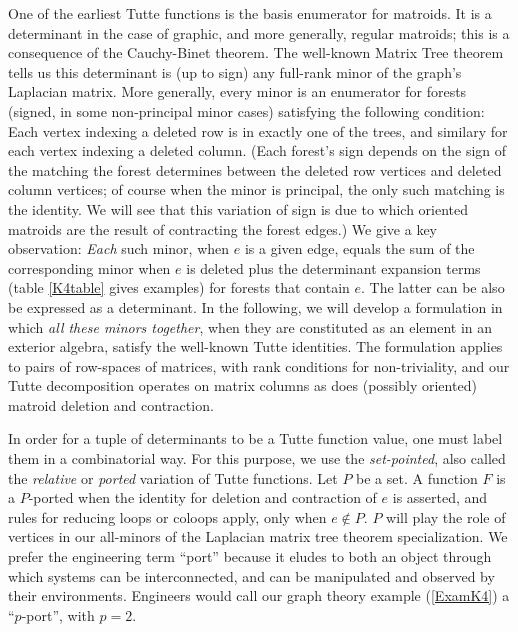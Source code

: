 \documentclass[Unicode]{cedram-alco}
\begin{document}
One of the earliest Tutte functions is the basis enumerator for matroids. It
is a determinant in the case of graphic, and more generally, regular matroids;
this is a consequence of the Cauchy-Binet theorem.
The well-known Matrix Tree theorem tells us this determinant is (up to sign)
any full-rank minor of the graph's Laplacian matrix. More generally,
every minor is an enumerator for forests (signed, in some non-principal minor
cases) satisfying the following condition: Each vertex indexing
a deleted row is in exactly one of the trees, and similary for each
vertex indexing a deleted column\cite{sdcMTT}.
(Each forest's sign depends on the sign of the
matching the forest determines between the deleted row vertices and
deleted column vertices; of course when the minor is principal,
the only such matching is the identity.  We will see that this variation of
sign is due to which oriented matroids are the result of contracting
the forest edges.)
We give a key observation: \emph{Each} such
minor, when $e$ is a given edge, equals the sum of the corresponding
minor when $e$ is deleted plus the determinant expansion terms (table \ref{K4table}
gives examples) for
forests that contain $e$.  The latter can be also be expressed as a determinant.
In the following, we will develop a formulation in which
\emph{all these minors together},
when they are constituted as an element in an exterior algebra, satisfy the
well-known Tutte identities.  The formulation applies to pairs of
row-spaces of matrices, with rank conditions for non-triviality,
and our Tutte decomposition operates on matrix
columns as does (possibly oriented)
matroid deletion and contraction.

In order for a tuple of determinants to be a Tutte function value, one
must label them in a combinatorial way.  For this purpose, we use
the \emph{set-pointed}\cite{TPMorphMatI99,TPMorphMatI99},
also called the
\emph{relative}\cite{RelTuttePolyDiaoHetyei} or
\emph{ported}\cite{sdcPorted,TutteEx}
variation of Tutte functions.
Let $P$ be a set.  A function $F$ is a $P$-ported
when the identity for deletion and contraction of $e$ is asserted,
and rules for reducing loops or coloops apply, only when $e \not\in P$.
$P$ will play the role of vertices in our all-minors of the Laplacian
matrix tree theorem specialization.
We prefer the engineering term ``port'' because it eludes to both an object through
which systems can be interconnected,
and can be manipulated and observed by their
environments\cite{Recski,narayanan1997submodular}.
Engineers would call our graph theory example (\ref{ExamK4}) a ``$p$-port'', with $p=2$.
\end{document}
